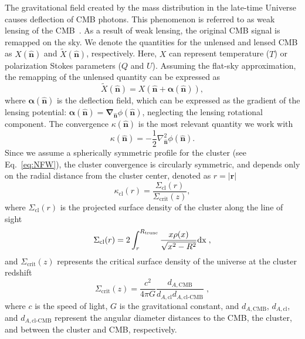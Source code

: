 \documentclass[prd, superscriptaddress, tightenlines, longbibliography, nofootinbib, eqsecnum, amsfonts, amsmath, floatfix, twocolumn, notitlepage]{revtex4-2}
\begin{document}
The gravitational field created by the mass distribution in the late-time Universe causes deflection of CMB photons. This phenomenon is referred to as weak lensing of the CMB~\cite{Lewis:2006fu}. As a result of weak lensing, the original CMB signal is remapped on the sky. We denote the quantities for the unlensed and lensed CMB as $X (\hat{\mathbf{n}})$ and $\widetilde{X} (\hat{\mathbf{n}})$, respectively. Here, $X$ can represent temperature ($T$) or polarization Stokes parameters ($Q$ and $U$). Assuming the flat-sky approximation, the remapping of the unlensed quantity can be expressed as
\begin{equation}
\widetilde{X} (\hat{\mathbf{n}}) = X (\hat{\mathbf{n}} + \boldsymbol{\alpha}(\hat{\mathbf{n}})),
\end{equation}
where $\boldsymbol{\alpha} (\hat{\mathbf{n}})$ is the deflection field, which can be expressed as the gradient of the lensing potential: $\boldsymbol{\alpha} (\hat{\mathbf{n}}) = \boldsymbol{\nabla}_{\hat{\mathbf{n}}}\phi(\hat{\mathbf{n}})$, neglecting the lensing rotational component. The convergence $\kappa (\hat{\mathbf{n}})$ is the most relevant quantity we work with
\begin{equation}
\kappa(\hat{\mathbf{n}}) = -\frac{1}{2}\nabla^2_{\hat{\mathbf{n}}}\phi(\hat{\mathbf{n}}).
\end{equation}
Since we assume a spherically symmetric profile for the cluster (see Eq.~\ref{eq:NFW}), the cluster convergence is circularly symmetric, and depends only on the radial distance from the cluster center, denoted as $r = |\mathbf{r}|$
\begin{equation}
\kappa_{\text{cl}}(r) = \frac{\Sigma_{\text{cl}}(r)}{\Sigma_{\text{crit}}(z)},
\end{equation}
where $\Sigma_{\text{cl}}(r)$ is the projected surface density of the cluster along the line of sight
\begin{equation}
\Sigma_{\rm{cl}}(r) = 2 \int_{r}^{R_{\rm{trunc}}}\frac{x\rho(x)}{\sqrt{x^2-R^2}} \rm{d} x \; ,
\end{equation}
and $\Sigma_{\text{crit}}(z)$ represents the critical surface density of the universe at the cluster redshift
\begin{equation}
\Sigma_{\text{crit}}(z) = \frac{c^2}{4\pi G}\frac{d_{A,\text{CMB}}}{d_{A,\text{cl}}d_{A,\text{cl-CMB}}} \; ,
\end{equation}
where $c$ is the speed of light, $G$ is the gravitational constant, and $d_{A,\text{CMB}}$, $d_{A,\text{cl}}$, and $d_{A,\text{cl-CMB}}$ represent the angular diameter distances to the CMB, the cluster, and between the cluster and CMB, respectively. 
\end{document}

